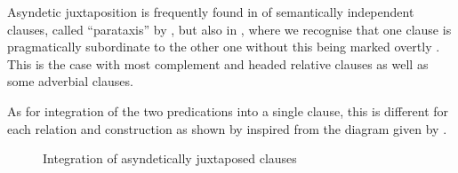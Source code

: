 Asyndetic juxtaposition is frequently found in  of semantically independent clauses, called “parataxis” by \citet[]{Lehmann1988}, but also in , where we recognise that one clause is pragmatically subordinate to the other one without this being marked overtly \citep[cf.][355]{Mithun1988}. This is the case with most complement and headed relative clauses as well as some adverbial clauses.

As for integration of the two predications into a single clause, this is different for each relation and construction as shown by  inspired from the diagram given by \citet[307]{Payne1997}. 

\begin{figure}
\centering
{}
\caption{Integration of asyndetically juxtaposed clauses}
\label{fig:IntegrationScaleAsyndeticJuxtaposition}
\end{figure}

